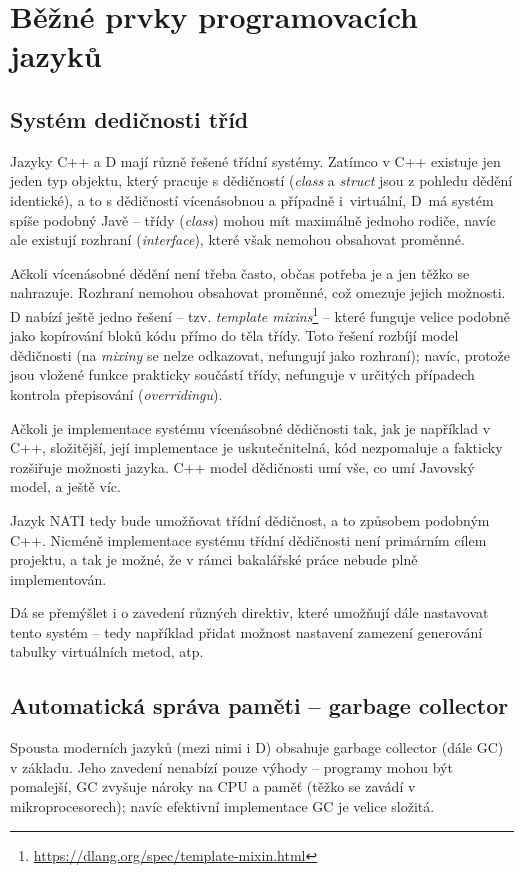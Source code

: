 \section{Běžné prvky programovacích jazyků}

\subsection{Systém dedičnosti tříd} Jazyky C++ a D mají různě řešené třídní systémy. Zatímco v C++ existuje jen jeden typ objektu, který pracuje s dědičností (\textit{class} a \textit{struct} jsou z pohledu dědění identické), a to s dědičností vícenásobnou a případně i~virtuální, D~má systém spíše podobný Javě -- třídy (\textit{class}) mohou mít maximálně jednoho rodiče, navíc ale existují rozhraní (\textit{interface}), které však nemohou obsahovat proměnné.

Ačkoli vícenásobné dědění není třeba často, občas potřeba je a jen těžko se nahrazuje. Rozhraní nemohou obsahovat proměnné, což omezuje jejich možnosti. D nabízí ještě jedno řešení -- tzv. \textit{template mixins}\footnote{\url{https://dlang.org/spec/template-mixin.html}} -- které funguje velice podobně jako kopírování bloků kódu přímo do těla třídy. Toto řešení rozbíjí model dědičnosti (na \textit{mixiny} se nelze odkazovat, nefungují jako rozhraní); navíc, protože jsou vložené funkce prakticky součástí třídy, nefunguje v určitých případech kontrola přepisování (\textit{overridingu}).

Ačkoli je implementace systému vícenásobné dědičnosti tak, jak je například v C++, složitější, její implementace je uskutečnitelná, kód nezpomaluje a fakticky rozšiřuje možnosti jazyka. C++ model dědičnosti umí vše, co umí Javovský model, a ještě víc.

Jazyk NATI tedy bude umožňovat třídní dědičnost, a to způsobem podobným C++. Nicméně implementace systému třídní dědičnosti není primárním cílem projektu, a tak je možné, že v rámci bakalářské práce nebude plně implementován.

Dá se přemýšlet i o zavedení různých direktiv, které umožňují dále nastavovat tento systém -- tedy například přidat možnost nastavení zamezení generování tabulky virtuálních metod, atp.

\subsection{Automatická správa paměti -- garbage collector}
Spousta moderních jazyků (mezi nimi i D) obsahuje garbage collector (dále GC) v základu. Jeho zavedení nenabízí pouze výhody -- programy mohou být pomalejší, GC zvyšuje nároky na CPU a paměť (těžko se zavádí v mikroprocesorech); navíc efektivní implementace GC je velice složitá.

